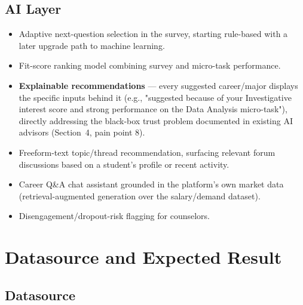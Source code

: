 \documentclass[a4paper]{article}
\begin{document}
\subsection{AI Layer}
\begin{itemize}
    \item Adaptive next-question selection in the survey, starting rule-based with a later
    upgrade path to machine learning.
    \item Fit-score ranking model combining survey and micro-task performance.
    \item \textbf{Explainable recommendations} — every suggested career/major displays the
    specific inputs behind it (e.g., "suggested because of your Investigative interest score
    and strong performance on the Data Analysis micro-task"), directly addressing the black-box
    trust problem documented in existing AI advisors (Section~4, pain point 8).
    \item Freeform-text topic/thread recommendation, surfacing relevant forum discussions
    based on a student's profile or recent activity.
    \item Career Q\&A chat assistant grounded in the platform's own market data
    (retrieval-augmented generation over the salary/demand dataset).
    \item Disengagement/dropout-risk flagging for counselors.
\end{itemize}

\section{Datasource and Expected Result}

\subsection{Datasource}
\end{document}
